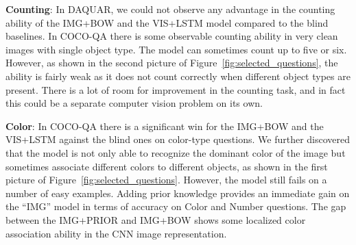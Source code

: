 \documentclass{article} %
\renewcommand{\#}[1]{\textbf{#1}}
\begin{document}
\textbf{Counting}: In DAQUAR, we could not observe any advantage in the
counting ability of the IMG+BOW and the VIS+LSTM model compared to the blind
baselines. In COCO-QA there is some observable counting ability in very clean
images with single object type. The model can sometimes count up to five or
six. However, as shown in the second picture of
Figure~\ref{fig:selected_questions}, the ability is fairly weak as it does not
count correctly when different object types are present. There is a lot of room
for improvement in the counting task, and in fact this could be a separate
computer vision problem on its own.

\textbf{Color}: In COCO-QA there is a significant win for the IMG+BOW and the
VIS+LSTM against the blind ones on color-type questions. We further discovered
that the model is not only able to recognize the dominant color of the image
but sometimes associate different colors to different objects, as shown in the
first picture of Figure~\ref{fig:selected_questions}. However, the model still
fails on a number of easy examples. Adding prior knowledge provides an
immediate gain on the ``IMG'' model in terms of accuracy on Color and Number
questions. The gap between the IMG+PRIOR and IMG+BOW shows some localized color
association ability in the CNN image representation.
\end{document}
